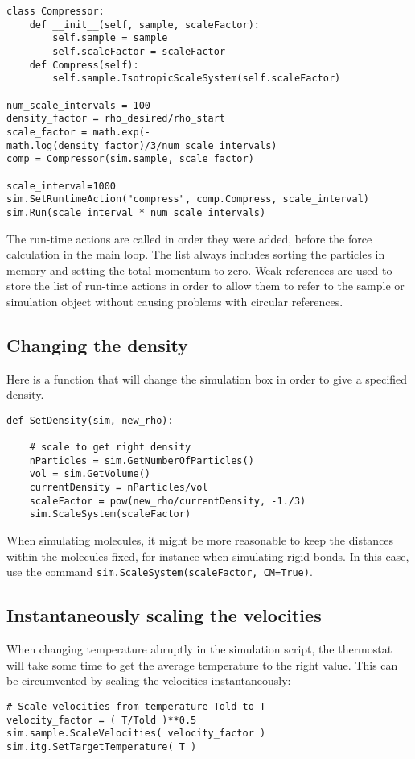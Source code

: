 \documentclass[a4paper]{article}
\begin{document}
\begin{verbatim}
class Compressor:
    def __init__(self, sample, scaleFactor):
        self.sample = sample
        self.scaleFactor = scaleFactor
    def Compress(self):
        self.sample.IsotropicScaleSystem(self.scaleFactor)

num_scale_intervals = 100
density_factor = rho_desired/rho_start
scale_factor = math.exp(-math.log(density_factor)/3/num_scale_intervals)
comp = Compressor(sim.sample, scale_factor)

scale_interval=1000
sim.SetRuntimeAction("compress", comp.Compress, scale_interval)
sim.Run(scale_interval * num_scale_intervals)

\end{verbatim}

The run-time actions are called in order they were added, before the force
calculation in the main loop. The list always includes sorting the particles 
in memory and setting the total momentum to zero. Weak references are used to
store the list of run-time actions in order to allow them to refer to the 
sample or simulation object without causing problems with circular references.

\subsection{Changing the density}

Here is a function that will change the simulation box in order to give a 
specified density.

\begin{verbatim}
def SetDensity(sim, new_rho):

    # scale to get right density
    nParticles = sim.GetNumberOfParticles()
    vol = sim.GetVolume()
    currentDensity = nParticles/vol
    scaleFactor = pow(new_rho/currentDensity, -1./3)
    sim.ScaleSystem(scaleFactor)
\end{verbatim}

When simulating molecules, it might be more reasonable to keep the distances within the molecules fixed, for instance when simulating rigid bonds. In this case, use the command \verb|sim.ScaleSystem(scaleFactor, CM=True)|.

\subsection{Instantaneously scaling the velocities}

When changing temperature abruptly in the simulation script, the thermostat will take some time to get the average temperature to the right value. This can be circumvented by scaling the velocities instantaneously:
\begin{verbatim}
# Scale velocities from temperature Told to T
velocity_factor = ( T/Told )**0.5
sim.sample.ScaleVelocities( velocity_factor )
sim.itg.SetTargetTemperature( T )
\end{verbatim}
\end{document}
